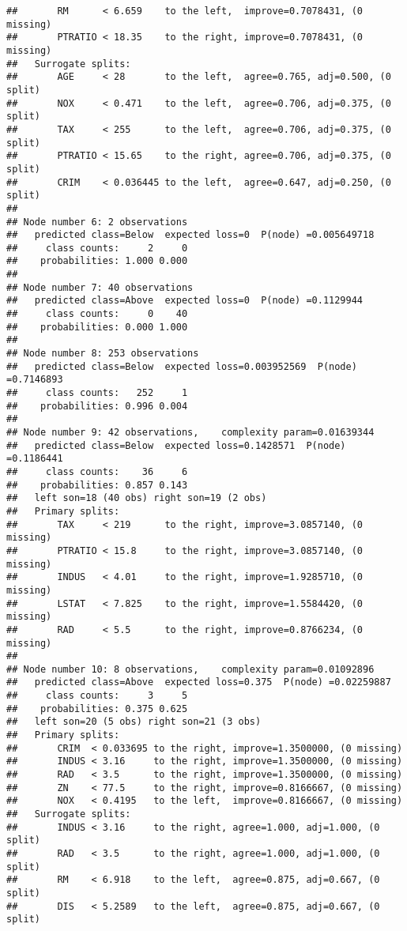 \documentclass[
]{article}
\begin{document}
\begin{verbatim}
##       RM      < 6.659    to the left,  improve=0.7078431, (0 missing)
##       PTRATIO < 18.35    to the right, improve=0.7078431, (0 missing)
##   Surrogate splits:
##       AGE     < 28       to the left,  agree=0.765, adj=0.500, (0 split)
##       NOX     < 0.471    to the left,  agree=0.706, adj=0.375, (0 split)
##       TAX     < 255      to the left,  agree=0.706, adj=0.375, (0 split)
##       PTRATIO < 15.65    to the right, agree=0.706, adj=0.375, (0 split)
##       CRIM    < 0.036445 to the left,  agree=0.647, adj=0.250, (0 split)
## 
## Node number 6: 2 observations
##   predicted class=Below  expected loss=0  P(node) =0.005649718
##     class counts:     2     0
##    probabilities: 1.000 0.000 
## 
## Node number 7: 40 observations
##   predicted class=Above  expected loss=0  P(node) =0.1129944
##     class counts:     0    40
##    probabilities: 0.000 1.000 
## 
## Node number 8: 253 observations
##   predicted class=Below  expected loss=0.003952569  P(node) =0.7146893
##     class counts:   252     1
##    probabilities: 0.996 0.004 
## 
## Node number 9: 42 observations,    complexity param=0.01639344
##   predicted class=Below  expected loss=0.1428571  P(node) =0.1186441
##     class counts:    36     6
##    probabilities: 0.857 0.143 
##   left son=18 (40 obs) right son=19 (2 obs)
##   Primary splits:
##       TAX     < 219      to the right, improve=3.0857140, (0 missing)
##       PTRATIO < 15.8     to the right, improve=3.0857140, (0 missing)
##       INDUS   < 4.01     to the right, improve=1.9285710, (0 missing)
##       LSTAT   < 7.825    to the right, improve=1.5584420, (0 missing)
##       RAD     < 5.5      to the right, improve=0.8766234, (0 missing)
## 
## Node number 10: 8 observations,    complexity param=0.01092896
##   predicted class=Above  expected loss=0.375  P(node) =0.02259887
##     class counts:     3     5
##    probabilities: 0.375 0.625 
##   left son=20 (5 obs) right son=21 (3 obs)
##   Primary splits:
##       CRIM  < 0.033695 to the right, improve=1.3500000, (0 missing)
##       INDUS < 3.16     to the right, improve=1.3500000, (0 missing)
##       RAD   < 3.5      to the right, improve=1.3500000, (0 missing)
##       ZN    < 77.5     to the right, improve=0.8166667, (0 missing)
##       NOX   < 0.4195   to the left,  improve=0.8166667, (0 missing)
##   Surrogate splits:
##       INDUS < 3.16     to the right, agree=1.000, adj=1.000, (0 split)
##       RAD   < 3.5      to the right, agree=1.000, adj=1.000, (0 split)
##       RM    < 6.918    to the left,  agree=0.875, adj=0.667, (0 split)
##       DIS   < 5.2589   to the left,  agree=0.875, adj=0.667, (0 split)

\end{verbatim}
\end{document}
